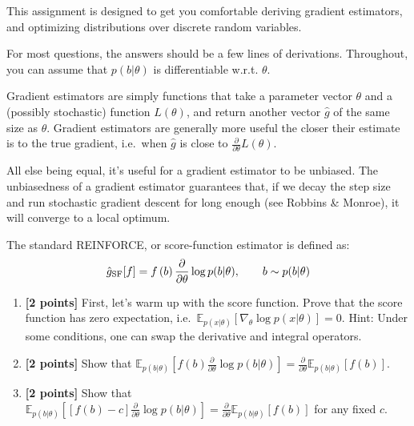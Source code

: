 \documentclass{harvardml}
\newcommand{\E}{\mathbb{E}}
\newcommand{\PT}{\frac{\partial}{\partial \theta}}
\theoremstyle{plain}
\begin{document}
This assignment is designed to get you comfortable deriving gradient estimators, and optimizing distributions over discrete random variables.

For most questions, the answers should be a few lines of derivations.
Throughout, you can assume that $p(b|\theta)$ is differentiable w.r.t. $\theta$.


\begin{problem}

Gradient estimators are simply functions that take a parameter vector $\theta$ and a (possibly stochastic) function $L(\theta)$, and return another vector $\hat g$ of the same size as $\theta$.
Gradient estimators are generally more useful the closer their estimate is to the true gradient, i.e.\ when $\hat g$ is close to $\PT L(\theta)$.

All else being equal, it's useful for a gradient estimator to be unbiased.
The unbiasedness of a gradient estimator guarantees that, if we decay the step size and run stochastic gradient descent for long enough (see Robbins \& Monroe), it will converge to a local optimum.

The standard REINFORCE, or score-function estimator is defined as:
%
\begin{align}
\hat g_\textnormal{SF}[f] = f \left( b \right) \PT \log p(b | \theta), \qquad b \sim p(b | \theta)
\end{align}
%
%
\begin{enumerate}[label=(\alph*)]
\item {\bf [2 points]} First, let's warm up with the score function.  Prove that the score function has zero expectation, i.e.\ $\E_{p(x|\theta)} \left[ \nabla_\theta \log p(x|\theta) \right] = 0$.
Hint: Under some conditions, one can swap the derivative and integral operators.

\item {\bf [2 points]} Show that $\E_{p(b|\theta)} \left[ f(b) \PT \log p(b | \theta) \right] = \PT \E_{p(b|\theta)} \left[ f(b) \right]$.

\item {\bf [2 points]} Show that $\E_{p(b|\theta)} \left[ [f(b) - c] \PT \log p(b | \theta) \right] = \PT \E_{p(b|\theta)} \left[ f(b) \right]$ for any fixed $c$.


\end{enumerate}
\end{problem}
\end{document}
